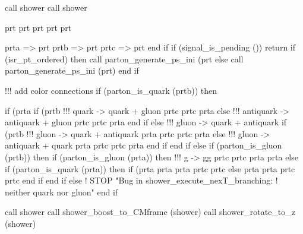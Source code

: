        call shower%
       call shower%

       prt%
       prt%
       prt%
       prt%
       prt%

       prta => prt
       prtb => prt%
       prtc => prt%
    end if
    if (signal_is_pending ()) return
    if (isr_pt_ordered) then
       call parton_generate_ps_ini (prt%
    else
       call parton_generate_ps_ini (prt)
    end if

    !!! add color connections
    if (parton_is_quark (prtb)) then

       if (prta%
          if (prtb%
             !!! quark -> quark + gluon
             prtc%
             prtc%
             prta%
          else
             !!! antiquark -> antiquark + gluon
             prtc%
             prtc%
             prta%
          end if
       else
          !!! gluon -> quark + antiquark
          if (prtb%
             !!! gluon -> quark + antiquark
             prta%
             prtc%
             prtc%
             prta%
          else
             !!! gluon -> antiquark + quark
             prta%
             prtc%
             prtc%
             prta%
            end if
         end if
      else if (parton_is_gluon (prtb)) then
         if (parton_is_gluon (prta)) then
            !!! g -> gg
            prtc%
            prtc%
            prta%
            prta%
         else if (parton_is_quark (prta)) then
            if (prta%
               prta%
               prta%
               prtc%
               prtc%
            else
               prta%
               prta%
               prtc%
               prtc%
            end if
         end if
      else
         ! STOP "Bug in shower_execute_nexT_branching:
         !   neither quark nor gluon"
      end if

      call shower%
      call shower_boost_to_CMframe (shower)
      call shower_rotate_to_z (shower)

